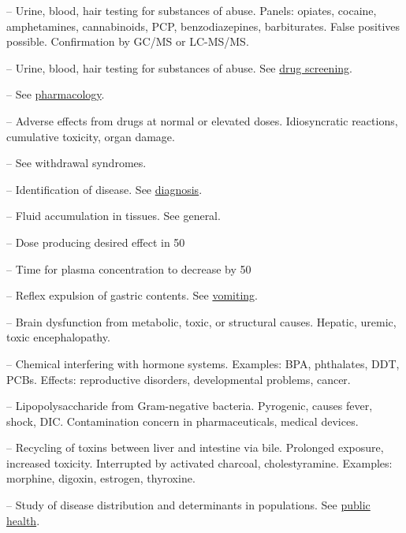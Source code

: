 -- Urine, blood, hair testing for substances of abuse. Panels: opiates, cocaine, amphetamines, cannabinoids, PCP, benzodiazepines, barbiturates. False positives possible. Confirmation by GC/MS or LC-MS/MS.

-- Urine, blood, hair testing for substances of abuse. See \hyperlink{Drug Screening}{drug screening}.

-- See \hyperlink{Pharmacology}{pharmacology}.

-- Adverse effects from drugs at normal or elevated doses. Idiosyncratic reactions, cumulative toxicity, organ damage.

-- See withdrawal syndromes.

-- Identification of disease. See \hyperlink{Diagnosis}{diagnosis}.

-- Fluid accumulation in tissues. See general.

-- Dose producing desired effect in 50%

-- Time for plasma concentration to decrease by 50%

-- Reflex expulsion of gastric contents. See \hyperlink{Vomiting}{vomiting}.

-- Brain dysfunction from metabolic, toxic, or structural causes. Hepatic, uremic, toxic encephalopathy.


-- Chemical interfering with hormone systems. Examples: BPA, phthalates, DDT, PCBs. Effects: reproductive disorders, developmental problems, cancer.

-- Lipopolysaccharide from Gram-negative bacteria. Pyrogenic, causes fever, shock, DIC. Contamination concern in pharmaceuticals, medical devices.

-- Recycling of toxins between liver and intestine via bile. Prolonged exposure, increased toxicity. Interrupted by activated charcoal, cholestyramine. Examples: morphine, digoxin, estrogen, thyroxine.

-- Study of disease distribution and determinants in populations. See \hyperlink{Public Health}{public health}.

